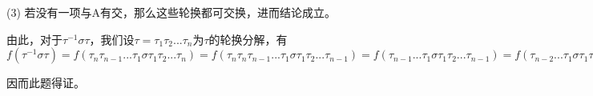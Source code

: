 \documentclass[UTF8]{ctexart}
\begin{document}
(3) 若没有一项与A有交，那么这些轮换都可交换，进而结论成立。

由此，对于$\tau^{-1}\sigma\tau$，我们设$\tau = \tau_1\tau_2...\tau_n$为$\tau$的轮换分解，有$f(\tau^{-1}\sigma\tau) = f(\tau_n\tau_{n-1}...\tau_1\sigma\tau_1\tau_2...\tau_n) = f(\tau_n\tau_n\tau_{n-1}...\tau_1\sigma\tau_1\tau_2...\tau_{n-1})=f(\tau_{n-1}...\tau_1\sigma\tau_1\tau_2...\tau_{n-1})=f(\tau_{n-2}...\tau_1\sigma\tau_1\tau_2...\tau_{n-2}) = ... = f(\sigma)$

因而此题得证。
\end{document}
